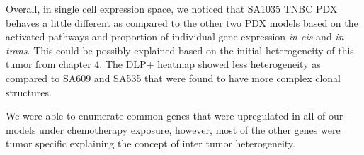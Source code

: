 Overall, in single cell expression space, we noticed that SA1035 TNBC PDX behaves a little different as compared to the other two PDX models based on the activated pathways and proportion of individual gene expression \textit{in cis} and \textit{in trans}. This could be possibly explained based on the initial heterogeneity of this tumor from chapter 4. The DLP+ heatmap showed less heterogeneity as compared to SA609 and SA535 that were found to have more complex clonal structures.

 We were able to enumerate common genes that were upregulated in all of our models under chemotherapy exposure, however, most of the other genes were tumor specific explaining the concept of inter tumor heterogeneity.
 












